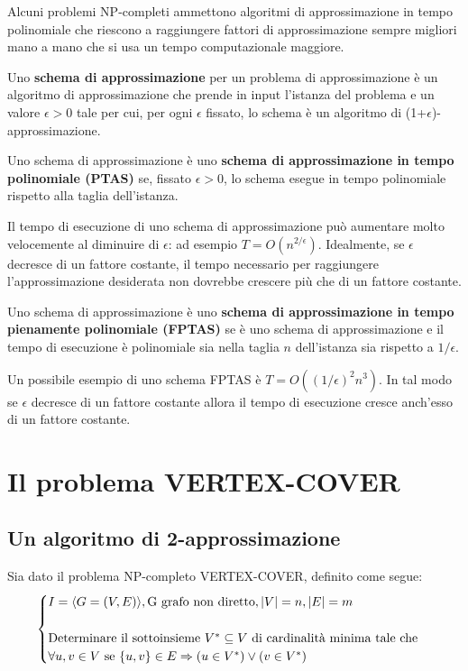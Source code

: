 Alcuni problemi NP-completi ammettono algoritmi di approssimazione in tempo polinomiale che riescono a raggiungere fattori di approssimazione sempre migliori mano a mano che si usa un tempo computazionale maggiore.

\begin{definizione}
Uno \textbf{schema di approssimazione} per un problema di approssimazione è un algoritmo di approssimazione che prende in input l'istanza del problema e un valore $\epsilon > 0$ tale per cui, per ogni $\epsilon$ fissato, lo schema è un algoritmo di (1+$\epsilon$)-approssimazione.
\end{definizione}

\begin{definizione}
Uno schema di approssimazione è uno \textbf{schema di approssimazione in tempo polinomiale (PTAS)} se, fissato $\epsilon > 0$, lo schema esegue in tempo polinomiale rispetto alla taglia dell'istanza.
\end{definizione}

Il tempo di esecuzione di uno schema di approssimazione può aumentare molto velocemente al diminuire di $\epsilon$: ad esempio $T=O(n^{2/\epsilon})$. Idealmente, se $\epsilon$ decresce di un fattore costante, il tempo necessario per raggiungere l'approssimazione desiderata non dovrebbe crescere più che di un fattore costante.

\begin{definizione}
Uno schema di approssimazione è uno \textbf{schema di approssimazione in tempo pienamente polinomiale (FPTAS)} se è uno schema di approssimazione e il tempo di esecuzione è polinomiale sia nella taglia $n$ dell'istanza sia rispetto a $1/\epsilon$.
\end{definizione}

Un possibile esempio di uno schema FPTAS è $T=O((1/\epsilon)^2n^3)$. In tal modo se $\epsilon$ decresce di un fattore costante allora il tempo di esecuzione cresce anch'esso di un fattore costante.

\section{Il problema VERTEX-COVER}
\subsection{Un algoritmo di 2-approssimazione}
Sia dato il problema NP-completo {VERTEX-COVER}, definito come segue:
\[
\begin{cases}
I=\langle G=(V,E)\rangle , \mbox{G grafo non diretto}, |V|=n, |E|=m \\
\\
\mbox{Determinare il sottoinsieme $V^* \subseteq V$ di cardinalità minima tale che} \\
\forall u,v \in V$ \mbox{se} $\{u,v\} \in E \Rightarrow (u \in V^*) \lor (v \in V^*)
\end{cases}
\]

